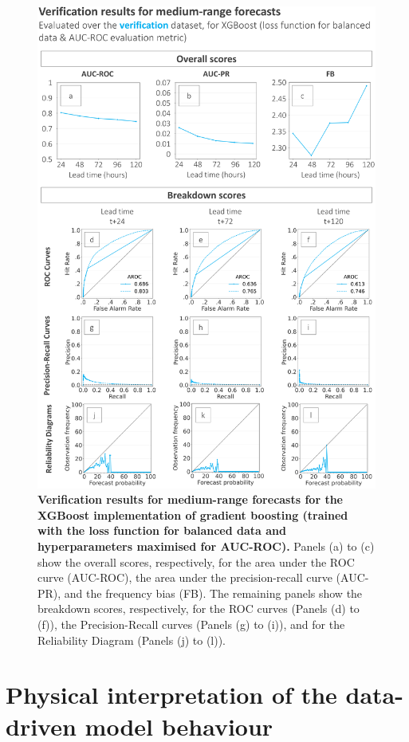 \documentclass[nhess, manuscript]{copernicus}
\begin{document}
\begin{figure}[t]
\includegraphics[width=12cm]{figures/verif_long_fc.png}
\caption{\textbf{Verification results for medium-range forecasts for the XGBoost implementation of gradient boosting (trained with the loss function for balanced data and hyperparameters maximised for AUC-ROC).} Panels (a) to (c) show the overall scores, respectively, for the area under the ROC curve (AUC-ROC), the area under the precision-recall curve (AUC-PR), and the frequency bias (FB). The remaining panels show the breakdown scores, respectively, for the ROC curves (Panels (d) to (f)), the Precision-Recall curves (Panels (g) to (i)), and for the Reliability Diagram (Panels (j) to (l)).}
\label{fig:verif_long_fc}
\end{figure}


\section{Physical interpretation of the data-driven model behaviour}
\label{data_driven_flash_floods_short_medium_range_physical_interpretation}
\end{document}
